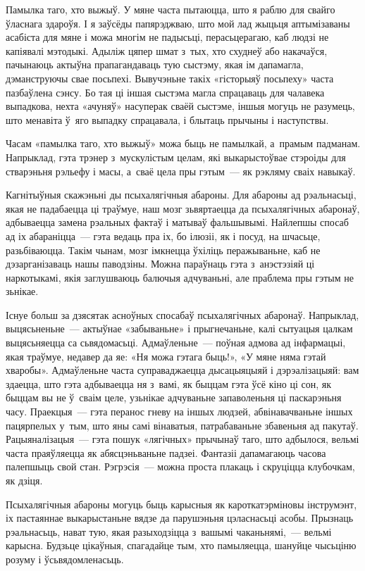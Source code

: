 Памылка таго, хто выжыў. У мяне часта пытаюцца, што я раблю для свайго ўласнага здароўя. І я заўсёды папярэджваю, што мой лад жыцьця аптымізаваны асабіста для мяне і можа многім не падысьці, перасьцерагаю, каб людзі не капіявалі мэтодыкі. Адыліж цяпер шмат з~тых, хто схуднеў або накачаўся, пачынаюць актыўна прапагандаваць тую сыстэму, якая ім дапамагла, дэманструючы свае посьпехі. Вывучэньне такіх «гісторыяў посьпеху» часта пазбаўлена сэнсу. Бо тая ці іншая сыстэма магла спрацаваць для чалавека выпадкова, нехта «ачуняў» насуперак сваёй сыстэме, іншыя могуць не разумець, што менавіта ў~яго выпадку спрацавала, і блытаць прычыны і наступствы.

Часам «памылка таго, хто выжыў» можа быць не памылкай, а~прамым падманам. Напрыклад, гэта трэнер з~мускулістым целам, які выкарыстоўвае стэроіды для стварэньня рэльефу і масы, а~сваё цела пры гэтым~--- як рэкляму сваіх навыкаў.

Кагнітыўныя скажэньні ды псыхалягічныя абароны. Для абароны ад рэальнасьці, якая не падабаецца ці траўмуе, наш мозг зьвяртаецца да псыхалягічных абаронаў, адбываецца замена рэальных фактаў і матываў фальшывымі. Найлепшы спосаб ад іх абараніцца~--- гэта ведаць пра іх, бо ілюзіі, як і посуд, на шчасьце, разьбіваюцца. Такім чынам, мозг імкнецца ўхіліць перажываньне, каб не дэзарганізаваць нашы паводзіны. Можна параўнаць гэта з~анэстэзіяй ці наркотыкамі, якія заглушваюць балючыя адчуваньні, але праблема пры гэтым не зьнікае.

Існуе больш за дзясятак асноўных спосабаў псыхалягічных абаронаў. Напрыклад, выцясьненьне~--- актыўнае «забываньне» і прыгнечаньне, калі сытуацыя цалкам выцясьняецца са сьвядомасьці. Адмаўленьне~--- поўная адмова ад інфармацыі, якая траўмуе, недавер да яе: «Ня можа гэтага быць!», «У мяне няма гэтай хваробы». Адмаўленьне часта суправаджаецца дысацыяцыяй і дэрэалізацыяй: вам здаецца, што гэта адбываецца ня з~вамі, як быццам гэта ўсё кіно ці сон, як быццам вы не ў~сваім целе, узьнікае адчуваньне запаволеньня ці паскарэньня часу. Праекцыя~--- гэта перанос гневу на іншых людзей, абвінавачваньне іншых пацярпелых у~тым, што яны самі вінаватыя, патрабаваньне збавеньня ад пакутаў. Рацыяналізацыя~--- гэта пошук «лягічных» прычынаў таго, што адбылося, вельмі часта праяўляецца як абясцэньваньне падзеі. Фантазіі дапамагаюць часова палепшыць свой стан. Рэгрэсія~--- можна проста плакаць і скруціцца клубочкам, як дзіця.

Псыхалягічныя абароны могуць быць карысныя як кароткатэрміновы інструмэнт, іх пастаяннае выкарыстаньне вядзе да парушэньня цэласнасьці асобы. Прызнаць рэальнасьць, нават тую, якая разыходзіцца з~вашымі чаканьнямі,~--- вельмі карысна. Будзьце цікаўныя, спагадайце тым, хто памыляецца, шануйце чысьціню розуму і ўсьвядомленасьць.

